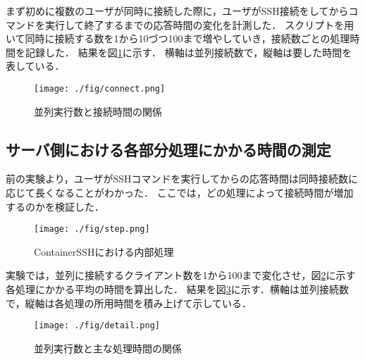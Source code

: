 \documentclass[dvipdfmx]{cs-handout}
\begin{document}
まず初めに複数のユーザが同時に接続した際に，ユーザがSSH接続をしてからコマンドを実行して終了するまでの応答時間の変化を計測した．
スクリプトを用いて同時に接続する数を1から10づつ100まで増やしていき，接続数ごとの処理時間を記録した．
結果を図\ref{fig:connect}に示す．
横軸は並列接続数で，縦軸は要した時間を表している．
%
%
%
\begin{figure}[tb]
\texttt{[image: ./fig/connect.png]}
\caption{並列実行数と接続時間の関係}
\label{fig:connect}
\end{figure}

\subsection{サーバ側における各部分処理にかかる時間の測定}

前の実験より，ユーザがSSHコマンドを実行してからの応答時間は同時接続数に応じて長くなることがわかった．
ここでは，どの処理によって接続時間が増加するのかを検証した．

%
\begin{figure}[tb]
\texttt{[image: ./fig/step.png]}
\caption{ContainerSSHにおける内部処理}
\label{fig:step}
\end{figure}
%


実験では，並列に接続するクライアント数を1から100まで変化させ，図\ref{fig:step}に示す各処理にかかる平均の時間を算出した．
結果を図\ref{fig:detail}に示す．横軸は並列接続数で，縦軸は各処理の所用時間を積み上げて示している．
%
\begin{figure}[tb]
\texttt{[image: ./fig/detail.png]}
\caption{並列実行数と主な処理時間の関係}
\label{fig:detail}
\end{figure}
%
\end{document}
